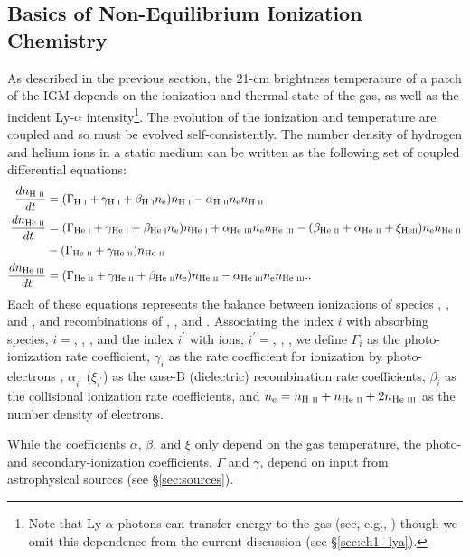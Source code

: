 \subsection{Basics of Non-Equilibrium Ionization Chemistry} \label{sec:chemistry}
As described in the previous section, the 21-cm brightness temperature of a patch of the IGM depends on the ionization and thermal state of the gas, as well as the incident Ly-$\alpha$ intensity\footnote{Note that Ly-$\alpha$ photons can transfer energy to the gas (see, e.g., \cite{Venumadhav}) though we omit this dependence from the current discussion (see \S\ref{sec:ch1_lya}).}. The evolution of the ionization and temperature are coupled and so must be evolved self-consistently. The number density of hydrogen and helium ions in a static medium can be written as the following set of coupled differential equations:
\begin{align}
    \frac{d n_{\text{H } \textsc{ii}}}{dt} & = (\Gamma_{\text{H } \textsc{i}} + \gamma_{\text{H } \textsc{i}} + \beta_{\text{H } \textsc{i}} n_{\text{e}}) n_{\text{H } \textsc{i}} - \alpha_{\text{H } \textsc{ii}} n_{\text{e}} n_{\text{H } \textsc{ii}}   \label{eq:HIIRateEquation} \\
    \frac{d n_{\text{He } \textsc{ii}}}{dt} & = (\Gamma_{\text{He } \textsc{i}} + \gamma_{\text{He } \textsc{i}} + \beta_{\text{He } \textsc{i}} n_{\text{e}}) n_{\text{He } \textsc{i}} \nonumber + \alpha_{\text{He } \textsc{iii}} n_{\text{e}} n_{\text{He } \textsc{iii}}  - (\beta_{\text{He } \textsc{ii}} + \alpha_{\text{He } \textsc{ii}} + \xi_{\text{He} \textsc{ii}}) n_{\text{e}} n_{\text{He } \textsc{ii}} \\ & - (\Gamma_{\text{He } \textsc{ii}} + \gamma_{\text{He } \textsc{ii}}) n_{\text{He } \textsc{ii}} \label{eq:HeIIRateEquation} \\ 
    \frac{d n_{\text{He } \textsc{iii}}}{dt} & = (\Gamma_{\text{He } \textsc{ii}} + \gamma_{\text{He } \textsc{ii}} + \beta_{\text{He } \textsc{ii}} n_{\text{e}}) n_{\text{He } \textsc{ii}}  - \alpha_{\text{He } \textsc{iii}} n_{\text{e}} n_{\text{He } \textsc{iii}} . \label{eq:HeIIIRateEquation} .
\end{align}
Each of these equations represents the balance between ionizations of species
\HI, \HeI, and \HeII, and recombinations of \HII, \HeII, and
\HeIII. Associating the index $i$ with absorbing species, $i = $\HI, \HeI,
\HeII, and the index $i^{\prime}$ with ions, $i^{\prime} = $\HII, \HeII,
\HeIII, we define $\Gamma_i$ as the photo-ionization rate coefficient,
$\gamma_i$ as the rate coefficient for ionization by photo-electrons \cite[; see \S\ref{sec:ch1_xrb}]{Shull1985,Furlanetto2010}, $\alpha_{i^{\prime}}$
($\xi_{i^{\prime}}$) as the case-B (dielectric) recombination rate
coefficients, $\beta_i$ as the collisional ionization rate coefficients, and
$n_{\text{e}} = n_{\text{H } \textsc{ii}} + n_{\text{He } \textsc{ii}} + 2n_{\text{He } \textsc{iii}}$ as the number density of electrons.

While the coefficients $\alpha$, $\beta$, and $\xi$ only depend on the gas temperature, the photo- and secondary-ionization coefficients, $\Gamma$ and $\gamma$, depend on input from astrophysical sources (see \S\ref{sec:sources}).

